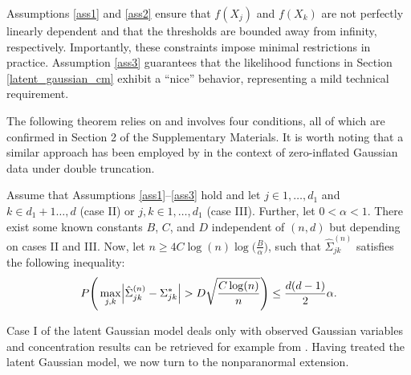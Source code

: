Assumptions \ref{ass1} and \ref{ass2} ensure that $f(X_j)$ and $f(X_k)$ are not perfectly linearly dependent and that the thresholds are bounded away from infinity, respectively. Importantly, these constraints impose minimal restrictions in practice. Assumption \ref{ass3} guarantees that the likelihood functions in Section \ref{latent_gaussian_cm} exhibit a ``nice'' behavior, representing a mild technical requirement.

The following theorem relies on \citet{Mei18} and involves four conditions, all of which are confirmed in Section 2 of the Supplementary Materials. It is worth noting that a similar approach has been employed by \citet{Anne19} in the context of zero-inflated Gaussian data under double truncation.

\begin{theorem}\label{uniform_convergence}
    Assume that Assumptions \ref{ass1}--\ref{ass3} hold and let $j \in 1, \dots, d_1$ and $k \in d_1+1 \dots, d$ (case II) or $j,k \in 1, \dots, d_1$ (case III). Further, let $0 < \alpha < 1$. There exist some known constants $B$, $C$, and $D$ independent of $(n,d)$ but depending on cases II and III. Now, let $n \geq 4 C \log(n) \log\Big(\frac{B}{\alpha}\Big)$, such that $\hat{\Sigma}_{jk}^{(n)}$ satisfies the following inequality:
    \begin{equation}
        P\Bigg(\max_{j,k}\abs{\hat{\Sigma}_{jk}^{(n)} - \Sigma_{jk}^{*}} > D\sqrt{\frac{C \log(n)}{n} }\Bigg) \leq \frac{d(d-1)}{2}\alpha.
    \end{equation}
\end{theorem}
\noindent Case I of the latent Gaussian model deals only with observed Gaussian variables and concentration results can be retrieved for example from \citet{Ravikumar11}. Having treated the latent Gaussian model, we now turn to the nonparanormal extension.


